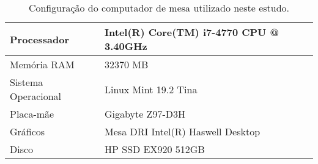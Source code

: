 \begin{table}[ht]
    \centering
    \caption{Configuração do computador de mesa utilizado neste estudo.}
    \begin{adjustbox}{max width={\textwidth},keepaspectratio}%
    \begin{tabular}{|l|l|}
        \hline
        Processador
        & Intel(R) Core(TM) i7-4770 CPU @ 3.40GHz
        \\ \hline
        Memória RAM
        & 32370 MB
        \\ \hline
        Sistema Operacional
        & Linux Mint 19.2 Tina
        \\ \hline
        Placa-mãe
        & Gigabyte Z97-D3H
        \\ \hline
        Gráficos
        & Mesa DRI Intel(R) Haswell Desktop
        \\ \hline
        Disco
        & HP SSD EX920 512GB
        \\ \hline
    \end{tabular}
    \end{adjustbox}
    \label{tab:sistema-computacional}
\end{table}